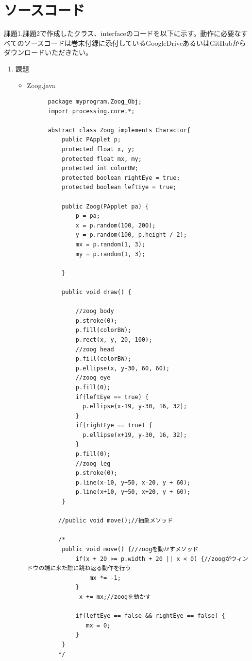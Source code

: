\documentclass[dvipdfmx]{jsarticle}
\begin{document}
\section{ソースコード}
課題1,課題2で作成したクラス、interfaceのコードを以下に示す。動作に必要なすべてのソースコードは巻末付録に添付しているGoogleDriveあるいはGitHubからダウンロードいただきたい。
\begin{enumerate}
  \item 課題
  \begin{itemize}
    \item Zoog.java
    \begin{verbatim}
      package myprogram.Zoog_Obj;
      import processing.core.*;

      abstract class Zoog implements Charactor{
          public PApplet p;
          protected float x, y;
          protected float mx, my;
          protected int colorBW;
          protected boolean rightEye = true;
          protected boolean leftEye = true;

          public Zoog(PApplet pa) {
              p = pa;
              x = p.random(100, 200);
              y = p.random(100, p.height / 2);
              mx = p.random(1, 3);
              my = p.random(1, 3);

          }

          public void draw() {

              //zoog body
              p.stroke(0);
              p.fill(colorBW);
              p.rect(x, y, 20, 100);
              //zoog head
              p.fill(colorBW);
              p.ellipse(x, y-30, 60, 60);
              //zoog eye
              p.fill(0);
              if(leftEye == true) {
                p.ellipse(x-19, y-30, 16, 32);
              }
              if(rightEye == true) {
                p.ellipse(x+19, y-30, 16, 32);
              }
              p.fill(0);
              //zoog leg
              p.stroke(0);
              p.line(x-10, y+50, x-20, y + 60);
              p.line(x+10, y+50, x+20, y + 60);
          }

         //public void move();//抽象メソッド

         /*
          public void move() {//zoogを動かすメソッド
              if(x + 20 >= p.width + 20 || x < 0) {//zoogがウィンドウの端に来た際に跳ね返る動作を行う
                  mx *= -1;
              }
               x += mx;//zoogを動かす

              if(leftEye == false && rightEye == false) {
                 mx = 0;
              }
          }
         */


\end{verbatim}
\end{itemize}
\end{enumerate}
\end{document}
